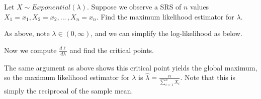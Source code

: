 \begin{examp}
Let $X \sim Exponential(\lambda)$. Suppose we observe a SRS of $n$ values $X_1 = x_1, X_2 = x_2, ... \,, X_n = x_n$. Find the maximum likelihood estimator for $\lambda$.
\par
\noindent As above, note $\lambda \in (0,\infty)$, and we can simplify the log-likelihood as below.
\par
\noindent Now we compute $\frac{d\ell}{d\lambda}$ and find the critical points.
\par
\noindent The same argument as above shows this critical point yields the global maximum, so the maximum likelihood estimator for $\lambda$ is $\widehat{\lambda} = \frac{n}{\sum_{i=1}^{n} X_i}$. Note that this is simply the reciprocal of the sample mean.
\end{examp}

